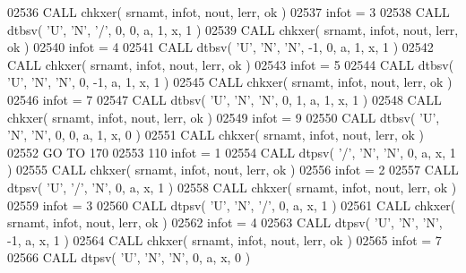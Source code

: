 \begin{DoxyCode}
02536       \textcolor{keyword}{CALL }chkxer( srnamt, infot, nout, lerr, ok )
02537       infot = 3
02538       \textcolor{keyword}{CALL }dtbsv( \textcolor{stringliteral}{'U'}, \textcolor{stringliteral}{'N'}, \textcolor{stringliteral}{'/'}, 0, 0, a, 1, x, 1 )
02539       \textcolor{keyword}{CALL }chkxer( srnamt, infot, nout, lerr, ok )
02540       infot = 4
02541       \textcolor{keyword}{CALL }dtbsv( \textcolor{stringliteral}{'U'}, \textcolor{stringliteral}{'N'}, \textcolor{stringliteral}{'N'}, -1, 0, a, 1, x, 1 )
02542       \textcolor{keyword}{CALL }chkxer( srnamt, infot, nout, lerr, ok )
02543       infot = 5
02544       \textcolor{keyword}{CALL }dtbsv( \textcolor{stringliteral}{'U'}, \textcolor{stringliteral}{'N'}, \textcolor{stringliteral}{'N'}, 0, -1, a, 1, x, 1 )
02545       \textcolor{keyword}{CALL }chkxer( srnamt, infot, nout, lerr, ok )
02546       infot = 7
02547       \textcolor{keyword}{CALL }dtbsv( \textcolor{stringliteral}{'U'}, \textcolor{stringliteral}{'N'}, \textcolor{stringliteral}{'N'}, 0, 1, a, 1, x, 1 )
02548       \textcolor{keyword}{CALL }chkxer( srnamt, infot, nout, lerr, ok )
02549       infot = 9
02550       \textcolor{keyword}{CALL }dtbsv( \textcolor{stringliteral}{'U'}, \textcolor{stringliteral}{'N'}, \textcolor{stringliteral}{'N'}, 0, 0, a, 1, x, 0 )
02551       \textcolor{keyword}{CALL }chkxer( srnamt, infot, nout, lerr, ok )
02552       \textcolor{keywordflow}{GO TO} 170
02553   110 infot = 1
02554       \textcolor{keyword}{CALL }dtpsv( \textcolor{stringliteral}{'/'}, \textcolor{stringliteral}{'N'}, \textcolor{stringliteral}{'N'}, 0, a, x, 1 )
02555       \textcolor{keyword}{CALL }chkxer( srnamt, infot, nout, lerr, ok )
02556       infot = 2
02557       \textcolor{keyword}{CALL }dtpsv( \textcolor{stringliteral}{'U'}, \textcolor{stringliteral}{'/'}, \textcolor{stringliteral}{'N'}, 0, a, x, 1 )
02558       \textcolor{keyword}{CALL }chkxer( srnamt, infot, nout, lerr, ok )
02559       infot = 3
02560       \textcolor{keyword}{CALL }dtpsv( \textcolor{stringliteral}{'U'}, \textcolor{stringliteral}{'N'}, \textcolor{stringliteral}{'/'}, 0, a, x, 1 )
02561       \textcolor{keyword}{CALL }chkxer( srnamt, infot, nout, lerr, ok )
02562       infot = 4
02563       \textcolor{keyword}{CALL }dtpsv( \textcolor{stringliteral}{'U'}, \textcolor{stringliteral}{'N'}, \textcolor{stringliteral}{'N'}, -1, a, x, 1 )
02564       \textcolor{keyword}{CALL }chkxer( srnamt, infot, nout, lerr, ok )
02565       infot = 7
02566       \textcolor{keyword}{CALL }dtpsv( \textcolor{stringliteral}{'U'}, \textcolor{stringliteral}{'N'}, \textcolor{stringliteral}{'N'}, 0, a, x, 0 )

\end{DoxyCode}
